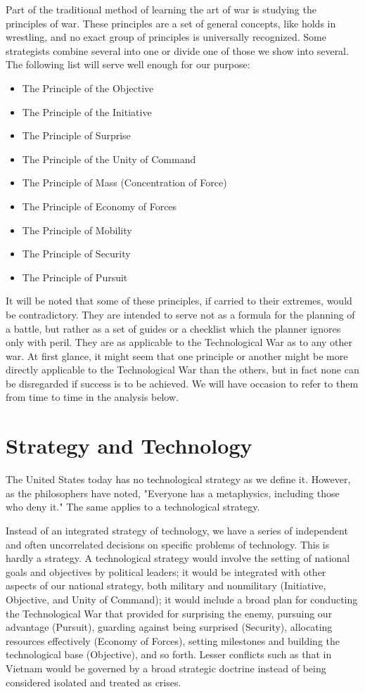 \documentclass[a4paper,12pt]{book}
\begin{document}
Part of the traditional method of learning the art of war is studying the principles of war. These principles are a set of general concepts, like holds in wrestling, and no exact group of principles is universally recognized. Some strategists combine several into one or divide one of those we show into several. The following list will serve well enough for our purpose:

\begin{itemize}
    \item The Principle of the Objective
    \item The Principle of the Initiative
    \item The Principle of Surprise
    \item The Principle of the Unity of Command
    \item The Principle of Mass (Concentration of Force)
    \item The Principle of Economy of Forces
    \item The Principle of Mobility
    \item The Principle of Security
    \item The Principle of Pursuit
\end{itemize}

It will be noted that some of these principles, if carried to their extremes, would be contradictory. They are intended to serve not as a formula for the planning of a battle, but rather as a set of guides or a checklist which the planner ignores only with peril. They are as applicable to the Technological War as to any other war. At first glance, it might seem that one principle or another might be more directly applicable to the Technological War than the others, but in fact none can be disregarded if success is to be achieved. We will have occasion to refer to them from time to time in the analysis below.

\section{Strategy and Technology}
The United States today has no technological strategy as we define it. However, as the philosophers have noted, "Everyone has a metaphysics, including those who deny it." The same applies to a technological strategy.

Instead of an integrated strategy of technology, we have a series of independent and often uncorrelated decisions on specific problems of technology. This is hardly a strategy. A technological strategy would involve the setting of national goals and objectives by political leaders; it would be integrated with other aspects of our national strategy, both military and nonmilitary (Initiative, Objective, and Unity of Command); it would include a broad plan for conducting the Technological War that provided for surprising the enemy, pursuing our advantage (Pursuit), guarding against being surprised (Security), allocating resources effectively (Economy of Forces), setting milestones and building the technological base (Objective), and so forth. Lesser conflicts such as that in Vietnam would be governed by a broad strategic doctrine instead of being considered isolated and treated as crises.
\end{document}
